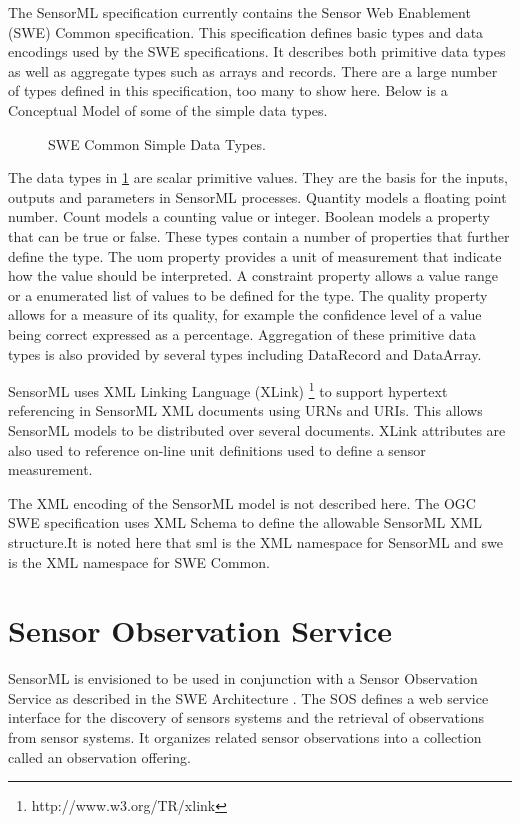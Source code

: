 \documentclass[]{final_report}
\begin{document}
The SensorML specification currently contains the Sensor Web Enablement (SWE) Common specification. This specification defines basic types and data encodings used by the SWE specifications. It describes both primitive data types as well as aggregate types such as arrays and records. There are a large number of types defined in this specification, too many to show here. Below is a Conceptual Model of some of the simple data types.

\begin{figure}[h]
\centering
{}
\caption{SWE Common Simple Data Types.}\label{fig:SWESimpleConceptualModel}
\end{figure}

The data types in \ref{fig:SWESimpleConceptualModel} are scalar primitive values. They are the basis for the inputs, outputs and parameters in SensorML processes. Quantity models a floating point number. Count models a counting value or integer.  Boolean models a property that can be true or false. These types contain a number of properties that further define the type. The uom property provides a unit of measurement that indicate how the value should be interpreted.  A constraint property allows a value range or a enumerated list of values to be defined for the type. The quality property allows for a measure of its quality, for example the confidence level of a value being correct expressed as a percentage. Aggregation of these primitive data types is also provided by several types including DataRecord and DataArray.

SensorML uses XML Linking Language (XLink) \footnote{http://www.w3.org/TR/xlink} to support hypertext referencing in SensorML XML documents using URNs and URIs. This allows SensorML models to be distributed over several documents. XLink attributes are also used to reference on-line unit definitions used to define a sensor measurement.

The XML encoding of the SensorML model is not described here. The OGC SWE specification uses XML Schema to define the allowable SensorML XML structure.It is noted here that sml is the XML namespace for SensorML and swe is the XML namespace for SWE Common.

\section{Sensor Observation Service}\label{SOSSec}
SensorML is envisioned to be used in conjunction with a Sensor Observation Service as described in the SWE Architecture \cite{SOSref}. The SOS defines a web service interface for the discovery of sensors systems and the retrieval of observations from sensor systems. It organizes related sensor observations into a collection called an observation offering.   
\end{document}

